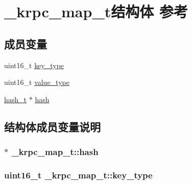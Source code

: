 \hypertarget{a00017}{}\section{\+\_\+krpc\+\_\+map\+\_\+t结构体 参考}
\label{a00017}
\subsection*{成员变量}
\begin{DoxyCompactItemize}
\item 
uint16\+\_\+t \hyperlink{a00017_ac15cc07012dd09c3148595a58e7044c8_ac15cc07012dd09c3148595a58e7044c8}{key\+\_\+type}
\item 
uint16\+\_\+t \hyperlink{a00017_acc4c0879bedc13cb9b4e2f3695905810_acc4c0879bedc13cb9b4e2f3695905810}{value\+\_\+type}
\item 
\hyperlink{a00050_a188677c3015513590ab998e96b999966_a188677c3015513590ab998e96b999966}{hash\+\_\+t} $\ast$ \hyperlink{a00017_aed4e46fb2ad26a88c6e03d666c1170f7_aed4e46fb2ad26a88c6e03d666c1170f7}{hash}
\end{DoxyCompactItemize}


\subsection{结构体成员变量说明}
\hypertarget{a00017_aed4e46fb2ad26a88c6e03d666c1170f7_aed4e46fb2ad26a88c6e03d666c1170f7}{}
\subsubsection[{hash}]{$\ast$ \+\_\+krpc\+\_\+map\+\_\+t\+::hash}\label{a00017_aed4e46fb2ad26a88c6e03d666c1170f7_aed4e46fb2ad26a88c6e03d666c1170f7}
\hypertarget{a00017_ac15cc07012dd09c3148595a58e7044c8_ac15cc07012dd09c3148595a58e7044c8}{}
\subsubsection[{key\+\_\+type}]{\setlength{\rightskip}{0pt plus 5cm}uint16\+\_\+t \+\_\+krpc\+\_\+map\+\_\+t\+::key\+\_\+type}\label{a00017_ac15cc07012dd09c3148595a58e7044c8_ac15cc07012dd09c3148595a58e7044c8}
\hypertarget{a00017_acc4c0879bedc13cb9b4e2f3695905810_acc4c0879bedc13cb9b4e2f3695905810}{}
